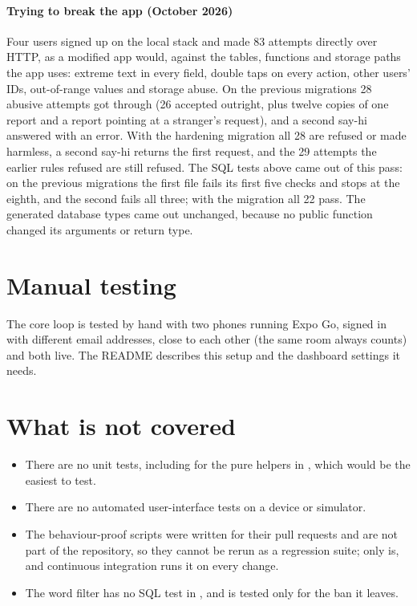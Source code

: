 \paragraph{Trying to break the app (October 2026)} Four users signed up on the local stack and made 83
attempts directly over HTTP, as a modified app would, against the tables, functions and storage paths the
app uses: extreme text in every field, double taps on every action, other users' IDs, out-of-range values
and storage abuse. On the previous migrations 28 abusive attempts got through (26 accepted outright, plus
twelve copies of one report and a report pointing at a stranger's request), and a second say-hi answered
with an error. With the hardening migration all 28 are refused or made harmless, a second say-hi returns
the first request, and the 29 attempts the earlier rules refused are still refused. The SQL tests above
came out of this pass: on the previous migrations the first file fails its first five checks and stops
at the eighth, and the second fails all three; with the migration all 22 pass. The generated database types came out unchanged, because no public
function changed its arguments or return type.

\section{Manual testing}

The core loop is tested by hand with two phones running Expo Go, signed in with different email
addresses, close to each other (the same room always counts) and both live. The README describes this setup and the
dashboard settings it needs.

\section{What is not covered}

\begin{itemize}
  \item There are no unit tests, including for the pure helpers in , which would be the
    easiest to test.
  \item There are no automated user-interface tests on a device or simulator.
  \item The behaviour-proof scripts were written for their pull requests and are not part of the
    repository, so they cannot be rerun as a regression suite; only  is, and
    continuous integration runs it on every change.
  \item The word filter has no SQL test in , and  is tested
    only for the ban it leaves.
\end{itemize}
